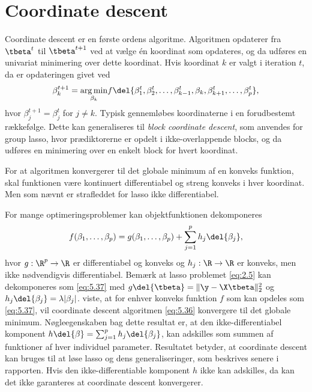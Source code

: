 \section{Coordinate descent} \label{sec:theory_coordinatedescent}
%
Coordinate descent er en første ordens algoritme.
Algoritmen opdaterer fra \(\tbeta^t\) til \(\tbeta^{t+1}\) ved at vælge én koordinat som opdateres, og da udføres en univariat minimering over dette koordinat.
Hvis koordinat $k$ er valgt i iteration $t$, da er opdateringen givet ved
\begin{align}
\beta_k^{t+1} =\underset{ \beta_k}{\arg \min}  f\del{ \beta_1^t, \beta_2^t, \dots, \beta_{k-1}^t, \beta_k, \beta_{k+1}^t, \dots, \beta_p^t  }, \label{eq:5.36}
\end{align}
hvor $\beta_j^{t+1} = \beta_j^t$ for $j \neq k$. 
Typisk gennemløbes koordinaterne i en forudbestemt rækkefølge.
Dette kan generaliseres til \textit{block coordinate descent}, som anvendes for group lasso, hvor prædiktorerne er opdelt i ikke-overlappende blocks, og da udføres en minimering over en enkelt block for hvert koordinat.

For at algoritmen konvergerer til det globale minimum af en konveks funktion, skal funktionen være kontinuert differentiabel og streng konveks i hver koordinat. 
Men som nævnt er strafleddet for lasso ikke differentiabel.

For mange optimeringsproblemer kan objektfunktionen dekomponeres
\begin{align}
f(\beta_1, \dots, \beta_p) = g(\beta_1, \dots, \beta_p) + \sum_{j = 1}^p h_j \del{\beta_j}, \label{eq:5.37}
\end{align}
hvor \(g: \R^p \rightarrow \R\) er differentiabel og konveks og \(h_j: \R \rightarrow \R\) er konveks, men ikke nødvendigvis differentiabel.
Bemærk at lasso problemet \eqref{eq:2.5} kan dekomponeres som \eqref{eq:5.37} med \(g \del{\tbeta} =\Vert \y - \X \tbeta \Vert_2^2\) og \(h_j \del{\beta_j} = \lambda \vert \beta_j \vert\).
\citep{Tseng_coordinate} viste, at for enhver konveks funktion \(f\) som kan opdeles som \eqref{eq:5.37}, vil coordinate descent algoritmen \eqref{eq:5.36} konvergere til det globale minimum. 
Nøgleegenskaben bag dette resultat er, at den ikke-differentiabel komponent \(h \del{\beta} = \sum_{j=1}^p h_j \del{\beta_j}\), kan adskilles som summen af funktioner af hver individuel parameter.
Resultatet betyder, at coordinate descent kan bruges til at løse lasso og dens generaliseringer, som beskrives senere i rapporten.
Hvis den ikke-differentiable komponent \(h\) ikke kan adskilles, da kan det ikke garanteres at coordinate descent konvergerer.

